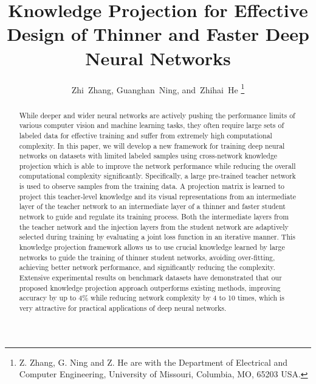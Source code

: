 \documentclass[journal]{IEEEtran}
\begin{document}
\title{Knowledge Projection for Effective Design of Thinner and Faster Deep Neural Networks}

\author{Zhi~Zhang,
        Guanghan~Ning,
        and~Zhihai~He%
\thanks{Z. Zhang, G. Ning and Z. He are with the Department
of Electrical and Computer Engineering, University of Missouri, Columbia,
MO, 65203 USA.}}%















\maketitle



\begin{abstract}
While deeper and wider neural networks are actively pushing the performance limits of various computer vision and machine learning tasks, they often require large sets of labeled data for effective training and suffer from extremely high computational complexity. 
In this paper, we will develop a new framework for training deep neural networks
on datasets with limited labeled samples using cross-network knowledge projection which is able to improve the network performance while reducing the overall computational complexity significantly. 
Specifically, a large pre-trained teacher network is used to observe samples from the training data. A projection matrix is learned to project 
this teacher-level knowledge and its visual representations from an intermediate layer of the teacher network to an intermediate layer of a thinner and faster student network to guide and regulate its training process. 
Both the intermediate layers from the teacher network and the injection layers
from the student network are adaptively selected during training by evaluating a joint loss function in an iterative manner. 
This knowledge projection framework allows us to use crucial knowledge learned by large networks to guide the training of thinner student networks, 
avoiding over-fitting, achieving better network performance, and significantly reducing the complexity.
Extensive experimental results on benchmark datasets have demonstrated that our proposed knowledge projection approach outperforms existing methods, improving accuracy by up to 4\% while reducing network complexity by 4 to 10 times, which is very attractive for practical applications of deep neural networks.
\end{abstract}
\end{document}
